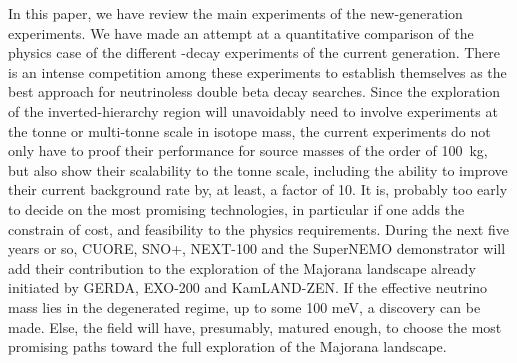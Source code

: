 \documentclass{PoS}
\begin{document}
In this paper, we have review the main experiments of the new-generation experiments. We have made an attempt at a quantitative comparison of the physics case of the different \bbonu-decay experiments of the current generation. There is an intense competition among these experiments to establish themselves as the best approach for neutrinoless double beta decay searches. Since the exploration of the inverted-hierarchy region will unavoidably need to involve experiments at the tonne or multi-tonne scale in isotope mass, the current experiments do not only have to proof their performance for source masses of the order of 100~kg, but also show their scalability to the tonne scale, including the ability to improve their current background rate by, at least, a factor of 10. It is, probably too early to decide on the most promising technologies, in particular if one adds the constrain of cost, and feasibility to the physics requirements. During the next five years or so, CUORE, SNO+, NEXT-100 and the SuperNEMO demonstrator will add their contribution to the exploration of the Majorana landscape already initiated by GERDA, EXO-200 and KamLAND-ZEN. If the effective neutrino mass lies in the degenerated regime, up to some 100 meV, a discovery can be made. Else, the field will have, presumably, matured enough, to choose the most promising paths toward the full exploration of the Majorana landscape.  




\end{document}
